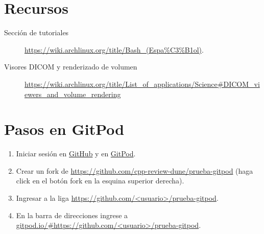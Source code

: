 \documentclass[9pt,a3paper]{scrartcl}
\begin{document}
\section*{\Huge Recursos}

\begin{description}
	\item[Sección de tutoriales]
		\url{https://wiki.archlinux.org/title/Bash_(Espa%C3%B1ol)}.
	\item[Visores DICOM y renderizado de volumen]
		\url{https://wiki.archlinux.org/title/List_of_applications/Science#DICOM_viewers_and_volume_rendering}
\end{description}

\section*{\Huge Pasos en GitPod}

\begin{enumerate}
	\item Iniciar sesión en \href{https://github.com/login}{GitHub} y en \href{https://gitpod.io/login}{GitPod}.
	\item Crear un fork de \url{https://github.com/cpp-review-dune/prueba-gitpod} (haga click en el botón fork en la esquina superior derecha).
	\item Ingresar a la liga \url{https://github.com/<usuario>/prueba-gitpod}.
	\item En la barra de direcciones ingrese a \url{gitpod.io/#https://github.com/<usuario>/prueba-gitpod}.
\end{enumerate}

\vfill

\end{document}
